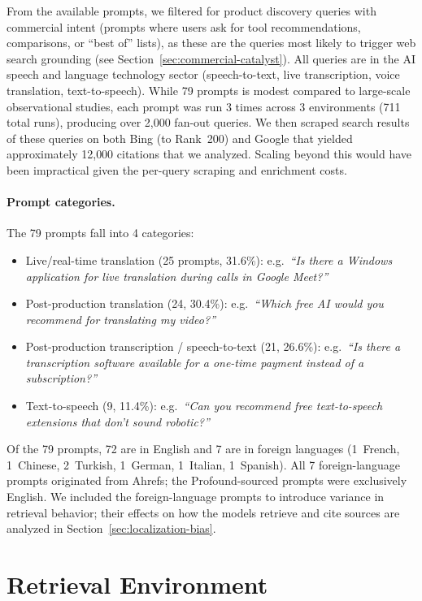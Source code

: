 From the available prompts, we filtered for product discovery queries with commercial intent (prompts where users ask for tool recommendations, comparisons, or ``best of'' lists), as these are the queries most likely to trigger web search grounding (see Section~\ref{sec:commercial-catalyst}).
All queries are in the AI speech and language technology sector
(speech-to-text, live transcription, voice translation, text-to-speech).
While 79 prompts is modest compared to large-scale observational studies, each prompt was run 3 times across 3 environments (711 total runs), producing over 2{,}000 fan-out queries. We then scraped search results of these queries on both Bing (to Rank~200) and Google that yielded approximately 12{,}000 citations that we analyzed. Scaling beyond this would have been impractical given the per-query scraping and enrichment costs.

\paragraph{Prompt categories.}
The 79 prompts fall into 4 categories:
\begin{itemize}
  \item Live/real-time translation (25 prompts, 31.6\%):
    e.g.\ \emph{``Is there a Windows application for live translation
    during calls in Google Meet?''}
  \item Post-production translation (24, 30.4\%):
    e.g.\ \emph{``Which free AI would you recommend for translating my video?''}
  \item Post-production transcription / speech-to-text (21, 26.6\%):
    e.g.\ \emph{``Is there a transcription software available for a one-time payment
    instead of a subscription?''}
  \item Text-to-speech (9, 11.4\%):
    e.g.\ \emph{``Can you recommend free text-to-speech extensions
    that don't sound robotic?''}
\end{itemize}

Of the 79 prompts, 72 are in English and 7 are in foreign languages (1~French, 1~Chinese, 2~Turkish, 1~German, 1~Italian, 1~Spanish). All 7 foreign-language prompts originated from Ahrefs; the Profound-sourced prompts were exclusively English. We included the foreign-language prompts to introduce variance in retrieval behavior; their effects on how the models retrieve and cite sources are analyzed in Section~\ref{sec:localization-bias}.
\label{sec:localization}

\section{Retrieval Environment}
\label{sec:proxy-requirement}

